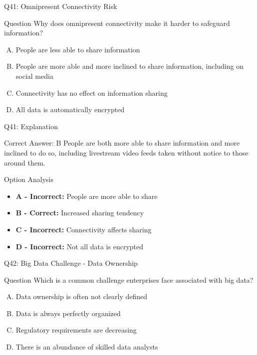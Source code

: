 \documentclass{beamer}
\begin{document}
	\begin{frame}{Q41: Omnipresent Connectivity Risk}
		\begin{block}{Question}
			Why does omnipresent connectivity make it harder to safeguard information?
		\end{block}
		\begin{enumerate}[(A)]
			\item People are less able to share information
			\item People are more able and more inclined to share information, including on social media
			\item Connectivity has no effect on information sharing
			\item All data is automatically encrypted
		\end{enumerate}
	\end{frame}
	
	\begin{frame}{Q41: Explanation}
		\begin{block}{Correct Answer: B}
			People are both more able to share information and more inclined to do so, including livestream video feeds taken without notice to those around them.
		\end{block}
		\begin{block}{Option Analysis}
			\begin{itemize}
				\item \textbf{A - Incorrect:} People are more able to share
				\item \textbf{B - Correct:} Increased sharing tendency
				\item \textbf{C - Incorrect:} Connectivity affects sharing
				\item \textbf{D - Incorrect:} Not all data is encrypted
			\end{itemize}
		\end{block}
	\end{frame}
	
	\begin{frame}{Q42: Big Data Challenge - Data Ownership}
		\begin{block}{Question}
			Which is a common challenge enterprises face associated with big data?
		\end{block}
		\begin{enumerate}[(A)]
			\item Data ownership is often not clearly defined
			\item Data is always perfectly organized
			\item Regulatory requirements are decreasing
			\item There is an abundance of skilled data analysts
		\end{enumerate}
	\end{frame}
	
\end{document}
